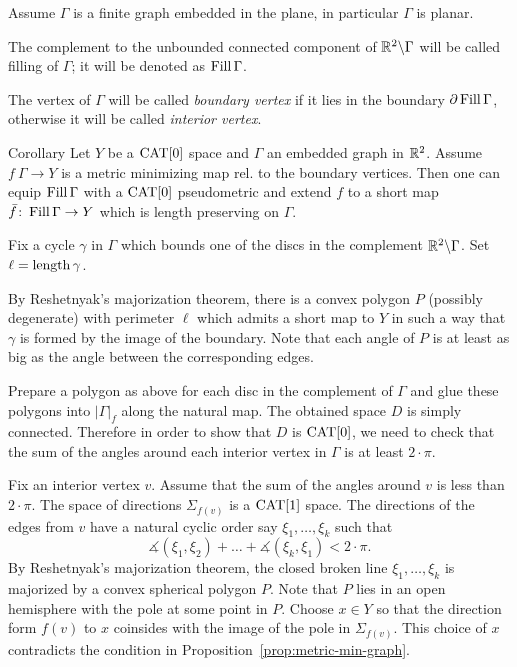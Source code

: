 \documentclass[a4paper,10pt]{amsart}
\begin{document}
Assume $\Gamma$ is a finite graph embedded in the plane,
in particular $\Gamma$ is planar.

The complement to the unbounded connected component of $\mathbb{R}^2\backslash\Gamma$ will be called filling of $\Gamma$;
it will be denoted as $\mathop{\rm Fill}\Gamma$.

The vertex of $\Gamma$ will be called \emph{boundary vertex}
if it lies in the boundary $\partial\mathop{\rm Fill}\Gamma$,
otherwise it will be called \emph{interior vertex}.

\begin{thm}{Corollary}\label{cor:planar-minimizing-graph}
Let $Y$ be a $\mathop{\rm CAT}\nolimits[0]$ space and
$\Gamma$ an embedded graph in $\mathbb{R}^2$.
Assume $f\:\Gamma\to Y$ is a metric minimizing map rel. to the boundary vertices. 
Then 
one can equip $\mathop{\rm Fill}\Gamma$ with a $\mathop{\rm CAT}\nolimits[0]$ pseudometric 
and extend $f$ to a short map $\bar f\colon\mathop{\rm Fill}\Gamma\to Y$ which is length preserving on $\Gamma$.
\end{thm}

Fix a cycle $\gamma$ in $\Gamma$ which bounds one of the discs in the complement $\mathbb{R}^2\backslash \Gamma$.
Set $\ell=\mathop{\rm length}\nolimits\gamma$.

By Reshetnyak's majorization theorem, there is a convex polygon $P$ (possibly degenerate) with perimeter $\ell$ which admits a short map to $Y$ in such a way that $\gamma$ is formed by the image of the boundary.
Note that each angle of $P$ is at least as big as 
the angle between the corresponding edges.

Prepare a polygon as above for each disc in the complement of $\Gamma$
and glue these polygons into $|\Gamma|_f$ along the natural map.
The obtained space $D$ is simply connected.
Therefore in order to show that $D$ is $\mathop{\rm CAT}\nolimits[0]$,
we need to check that the sum of the angles around each interior vertex in $\Gamma$ is at least $2\cdot\pi$.

Fix an interior vertex $v$.
Assume that the sum of the angles around $v$ is less than $2\cdot\pi$.
The space of directions $\Sigma_{f(v)}$ is a $\mathop{\rm CAT}\nolimits[1]$ space.
The directions of the edges from $v$ have a natural
cyclic order say $\xi_1,\dots,\xi_k$
such that
\[\measuredangle(\xi_1,\xi_2)+\dots+\measuredangle(\xi_k,\xi_1)<2\cdot\pi.\]
By Reshetnyak's majorization theorem,
the closed broken line $\xi_1,\dots,\xi_k$ is majorized by a convex spherical polygon $P$.
Note that $P$ lies in an open hemisphere with the pole  at some point in $P$.
Choose $x\in Y$ so that the direction form $f(v)$ to $x$ coinsides with the image of the pole in $\Sigma_{f(v)}$.
This choice of $x$ contradicts the condition in Proposition~\ref{prop:metric-min-graph}.\qeds
\end{document}

